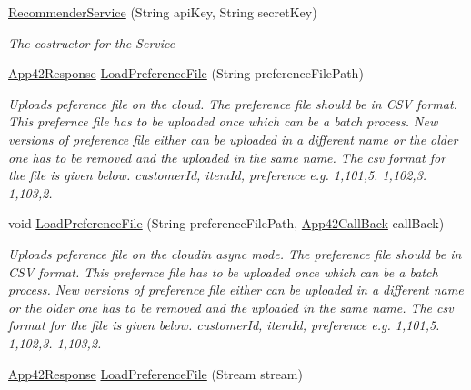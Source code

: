 \begin{DoxyCompactItemize}
\item 
\hyperlink{classcom_1_1shephertz_1_1app42_1_1paas_1_1sdk_1_1csharp_1_1recommend_1_1_recommender_service_a4eeed436c30ebfbe60f0bb6aff0c86f7}{Recommender\+Service} (String api\+Key, String secret\+Key)
\begin{DoxyCompactList}\small\item\em The costructor for the Service \end{DoxyCompactList}\item 
\hyperlink{classcom_1_1shephertz_1_1app42_1_1paas_1_1sdk_1_1csharp_1_1_app42_response}{App42\+Response} \hyperlink{classcom_1_1shephertz_1_1app42_1_1paas_1_1sdk_1_1csharp_1_1recommend_1_1_recommender_service_a9e10138be4f13442c98883034ebf58ab}{Load\+Preference\+File} (String preference\+File\+Path)
\begin{DoxyCompactList}\small\item\em Uploads peference file on the cloud. The preference file should be in C\+S\+V format. This prefernce file has to be uploaded once which can be a batch process. New versions of preference file either can be uploaded in a different name or the older one has to be removed and the uploaded in the same name. The csv format for the file is given below. customer\+Id, item\+Id, preference e.\+g. 1,101,5. 1,102,3. 1,103,2. \end{DoxyCompactList}\item 
void \hyperlink{classcom_1_1shephertz_1_1app42_1_1paas_1_1sdk_1_1csharp_1_1recommend_1_1_recommender_service_ac5e576c88aff43741a4989dfd151c442}{Load\+Preference\+File} (String preference\+File\+Path, \hyperlink{interfacecom_1_1shephertz_1_1app42_1_1paas_1_1sdk_1_1csharp_1_1_app42_call_back}{App42\+Call\+Back} call\+Back)
\begin{DoxyCompactList}\small\item\em Uploads peference file on the cloudin async mode. The preference file should be in C\+S\+V format. This prefernce file has to be uploaded once which can be a batch process. New versions of preference file either can be uploaded in a different name or the older one has to be removed and the uploaded in the same name. The csv format for the file is given below. customer\+Id, item\+Id, preference e.\+g. 1,101,5. 1,102,3. 1,103,2. \end{DoxyCompactList}\item 
\hyperlink{classcom_1_1shephertz_1_1app42_1_1paas_1_1sdk_1_1csharp_1_1_app42_response}{App42\+Response} \hyperlink{classcom_1_1shephertz_1_1app42_1_1paas_1_1sdk_1_1csharp_1_1recommend_1_1_recommender_service_af3fc9730c070a18a358104dc38c0a796}{Load\+Preference\+File} (Stream stream)

\end{DoxyCompactItemize}
